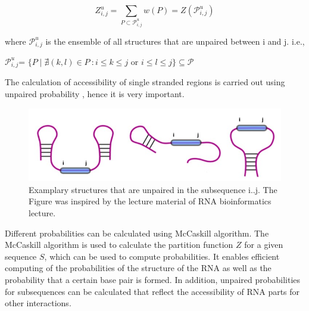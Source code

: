 \documentclass[twoside,a4paper]{report}
\begin{document}
 	  
 	 \begin{center}	 
 	 	\[ 
 	 	Z^u_{i,j}= \sum_{P \subset \mathcal{P}_{i,j}^{u}} w(P) = Z(\mathcal{P}_{i,j}^{u})
 	 	\]
 	 \end{center}
  
  	 where $\mathcal{P}_{i,j}^{u}$ is the ensemble of all structures that are unpaired between i and j.  i.e., \\
  	 
  	 
  	 \begin{center}	 
  	 
  	 	$\mathcal{P}^u_{i,j}$= $\{P \mid \nexists (k,l) \in P\ : i \leq k \leq j $ or $ i \leq l \leq j\}\subseteq \mathcal {P}$
  	 
  	 \end{center}
  	 
  	  The calculation of accessibility of single stranded regions is carried out using  unpaired probability \citep{muckstein2006thermodynamics}, hence it is very important. 
  
 	 
 	 
 	 \begin{figure}[tb]
 	 	\includegraphics[width=0.8\linewidth]{unpaired}
 	 	\centering
 	 	\caption{Examplary structures that are unpaired in the subsequence {i..j}. The Figure was inspired by the lecture material of RNA bioinformatics lecture.\\}
 	 	\label{fig:unpaired}
 	 \end{figure}
  
 	 Different probabilities can be calculated using McCaskill algorithm. The McCaskill algorithm \citep{mccaskill1990equilibrium} is used to calculate the partition function $Z$ for a given sequence $S$, which can be used to compute probabilities. It enables efficient computing of the probabilities of the structure of the RNA as well as the probability that a certain base pair is formed. In addition, unpaired probabilities for subsequences can be calculated that reflect the accessibility of RNA parts for other interactions.\\ 
 	
	
\end{document}
